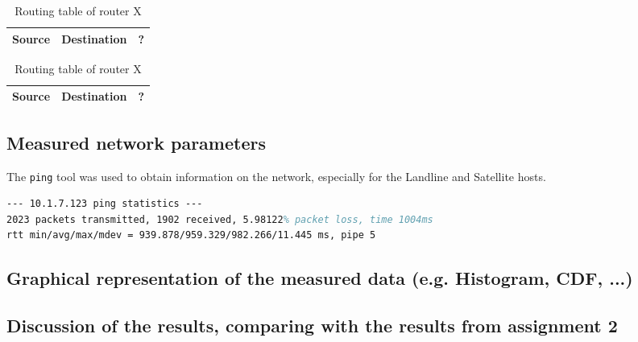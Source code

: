 \documentclass[parskip=full]{scrartcl}
\begin{document}
\begin{table}
    \centering
    \begin{tabular}{c c c }
       \hline
        Source & Destination & ? \\
       \hline 
       \hline
    \end{tabular}
    \caption{Routing table of router X}
    \label{tbl:routingTableX1}
\end{table}

\begin{table}
    \centering
    \begin{tabular}{c c c }
       \hline
        Source & Destination & ? \\
       \hline 
       \hline
    \end{tabular}
    \caption{Routing table of router X}
    \label{tbl:routingTableX2}
\end{table}

\subsection{Measured network parameters}

The \texttt{ping} tool was used to obtain information on the network, especially for the Landline and Satellite hosts.


\begin{lstlisting}[language=tex, breaklines, frame=single, caption={Landline Network Parameters}, label=lst:landlineNetwork, float, floatplacement=h]
--- 10.1.7.123 ping statistics ---
2023 packets transmitted, 1902 received, 5.98122% packet loss, time 1004ms
rtt min/avg/max/mdev = 939.878/959.329/982.266/11.445 ms, pipe 5
\end{lstlisting}


\subsection{Graphical representation of the measured data (e.g. Histogram, CDF, ...)}
\subsection{Discussion of the results, comparing with the results from assignment 2}




\end{document}
